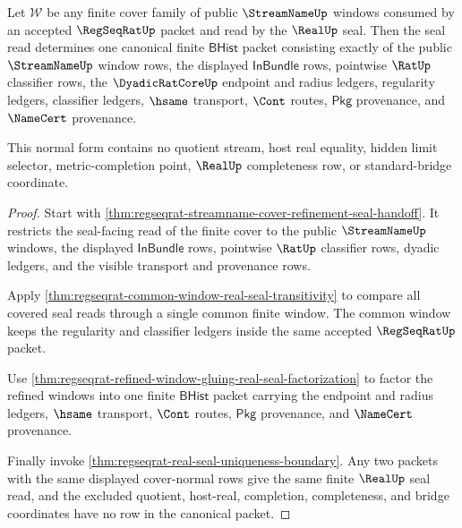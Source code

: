 \begin{theorem}
\label{thm:regseqrat-cover-normal-form-real-seal}
Let $\mathcal W$ be any finite cover family of public $\StreamNameUp$ windows
consumed by an accepted $\RegSeqRatUp$ packet and read by the $\RealUp$ seal.
Then the seal read determines one canonical finite $\mathsf{BHist}$ packet
consisting exactly of the public $\StreamNameUp$ window rows, the displayed
$\mathsf{InBundle}$ rows, pointwise $\RatUp$ classifier rows, the
$\DyadicRatCoreUp$ endpoint and radius ledgers, regularity ledgers, classifier
ledgers, $\hsame$ transport, $\Cont$ routes, $\mathsf{Pkg}$ provenance, and
$\NameCert$ provenance.

This normal form contains no quotient stream, host real equality, hidden limit
selector, metric-completion point, $\RealUp$ completeness row, or
standard-bridge coordinate.
\end{theorem}
\begin{proof}
Start with
\autoref{thm:regseqrat-streamname-cover-refinement-seal-handoff}. It restricts
the seal-facing read of the finite cover to the public $\StreamNameUp$ windows,
the displayed $\mathsf{InBundle}$ rows, pointwise $\RatUp$ classifier rows,
dyadic ledgers, and the visible transport and provenance rows.

Apply \autoref{thm:regseqrat-common-window-real-seal-transitivity} to compare
all covered seal reads through a single common finite window. The common window
keeps the regularity and classifier ledgers inside the same accepted
$\RegSeqRatUp$ packet.

Use \autoref{thm:regseqrat-refined-window-gluing-real-seal-factorization} to
factor the refined windows into one finite $\mathsf{BHist}$ packet carrying the
endpoint and radius ledgers, $\hsame$ transport, $\Cont$ routes, $\mathsf{Pkg}$
provenance, and $\NameCert$ provenance.

Finally invoke \autoref{thm:regseqrat-real-seal-uniqueness-boundary}. Any two
packets with the same displayed cover-normal rows give the same finite
$\RealUp$ seal read, and the excluded quotient, host-real, completion,
completeness, and bridge coordinates have no row in the canonical packet.
\end{proof}

